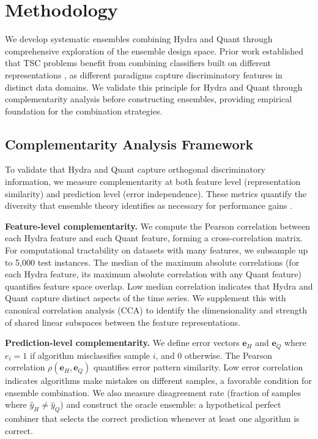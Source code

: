 \documentclass[pdflatex,sn-basic]{sn-jnl}           %
\theoremstyle{thmstyleone}%
\theoremstyle{thmstyletwo}%
\theoremstyle{thmstylethree}%
\begin{document}
\clearpage

\section{Methodology}\label{sec3}

We develop systematic ensembles combining Hydra and Quant through comprehensive exploration of the ensemble design space. Prior work established that TSC problems benefit from combining classifiers built on different representations \citep[p.~3213]{hive-cote-2}, as different paradigms capture discriminatory features in distinct data domains. We validate this principle for Hydra and Quant through complementarity analysis before constructing ensembles, providing empirical foundation for the combination strategies.

\subsection{Complementarity Analysis Framework}\label{subsec:complementarity}

To validate that Hydra and Quant capture orthogonal discriminatory information, we measure complementarity at both feature level (representation similarity) and prediction level (error independence). These metrics quantify the diversity that ensemble theory identifies as necessary for performance gains \citep{stacked-generalization}.

\textbf{Feature-level complementarity.} We compute the Pearson correlation between each Hydra feature and each Quant feature, forming a cross-correlation matrix. For computational tractability on datasets with many features, we subsample up to 5,000 test instances. The median of the maximum absolute correlations (for each Hydra feature, its maximum absolute correlation with any Quant feature) quantifies feature space overlap. Low median correlation indicates that Hydra and Quant capture distinct aspects of the time series. We supplement this with canonical correlation analysis (CCA) to identify the dimensionality and strength of shared linear subspaces between the feature representations.

\textbf{Prediction-level complementarity.} We define error vectors $\mathbf{e}_H$ and $\mathbf{e}_Q$ where $e_i = 1$ if algorithm misclassifies sample $i$, and 0 otherwise. The Pearson correlation $\rho(\mathbf{e}_H, \mathbf{e}_Q)$ quantifies error pattern similarity. Low error correlation indicates algorithms make mistakes on different samples, a favorable condition for ensemble combination. We also measure disagreement rate (fraction of samples where $\hat{y}_H \neq \hat{y}_Q$) and construct the oracle ensemble: a hypothetical perfect combiner that selects the correct prediction whenever at least one algorithm is correct.
\end{document}
